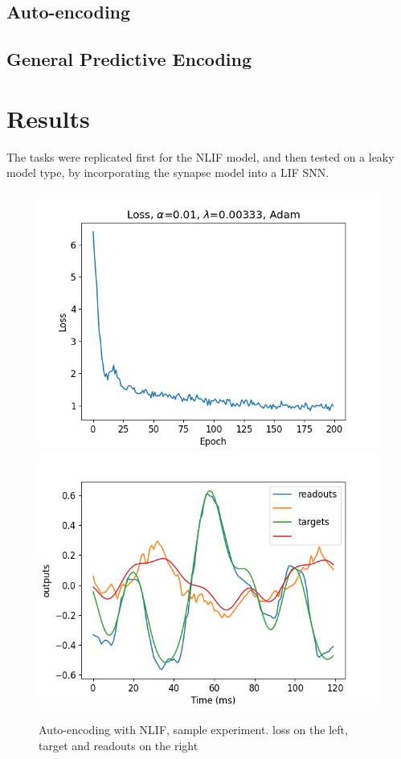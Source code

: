 \documentclass[mphil,deptreport,ianc]{infthesis} %
\begin{document}
\subsection{Auto-encoding}

\subsection{General Predictive Encoding}

\section{Results}

The tasks were replicated first for the NLIF model, and then tested on a leaky model type, by incorporating the synapse model into a LIF SNN.

\begin{figure}
    \centering
    \includegraphics[width=0.49\columnwidth]{figures/Gating/AutoEncoding/NLIF_sample/plot_loss_test_mt_NLIF_et_AutoEncoding_N_30_titers_200.png}
    \includegraphics[width=0.49\columnwidth]{figures/Gating/AutoEncoding/NLIF_sample/test_plot_outputs_NLIF_seed_23.png}
    \caption{Auto-encoding with NLIF, sample experiment. loss on the left, target and readouts on the right}
    \label{fig:autoencoding_NLIF}
\end{figure}
\end{document}

